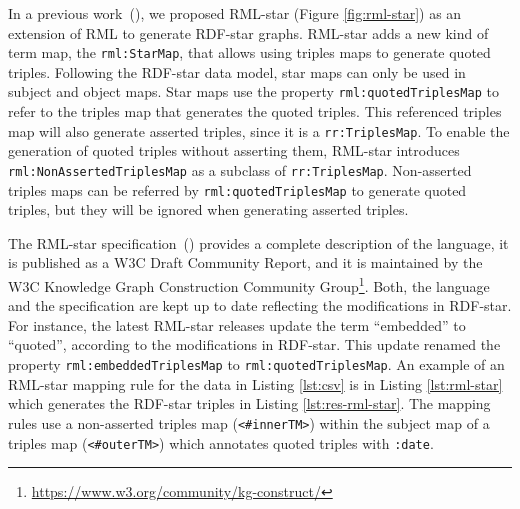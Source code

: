 In a previous work~(\cite{delva2021rml-star}), we proposed \mbox{RML-star} (Figure \ref{fig:rml-star}) as an extension of RML to generate \mbox{RDF-star} graphs. 
\mbox{RML-star} adds a new kind of term map, the \texttt{rml:StarMap}, that allows using triples maps to generate quoted triples. Following the \mbox{RDF-star} data model, star maps can only be used in subject and object maps. Star maps use the property \texttt{rml:quotedTriplesMap} to refer to the triples map that generates the quoted triples. This referenced triples map will also generate asserted triples, since it is a \texttt{rr:TriplesMap}. To enable the generation of quoted triples without asserting them, RML-star introduces \texttt{rml:NonAssertedTriplesMap} as a subclass of \texttt{rr:TriplesMap}. Non-asserted triples maps can be referred by \texttt{rml:quotedTriplesMap} to generate quoted triples, but they will be ignored when generating asserted triples.

The \mbox{RML-star} specification~(\cite{iglesias2022rmlstar}) provides a complete description of the language, it is published as a W3C Draft Community Report, and it is maintained by the W3C Knowledge Graph Construction Community Group\footnote{\url{https://www.w3.org/community/kg-construct/}}.
Both, the language and the specification are kept up to date reflecting the modifications in \mbox{RDF-star}.
For instance, the latest \mbox{RML-star} releases update the term ``embedded'' to ``quoted'',
according to the modifications in \mbox{RDF-star}.
This update renamed the property \texttt{rml:embeddedTriplesMap} to \texttt{rml:quotedTriplesMap}.
An example of an \mbox{RML-star} mapping rule for the data in Listing \ref{lst:csv} is in Listing \ref{lst:rml-star} which generates the \mbox{RDF-star} triples in Listing \ref{lst:res-rml-star}. 
The mapping rules use a non-asserted triples map (\texttt{<\#innerTM>}) within the subject map of a triples map (\texttt{<\#outerTM>}) which annotates quoted triples with \texttt{:date}.



